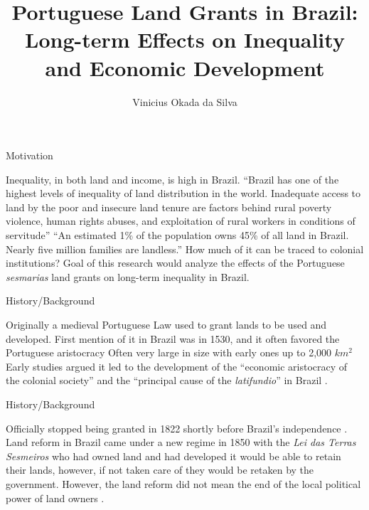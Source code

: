 \documentclass[aspectratio=1610]{beamer}
\title{Portuguese Land Grants in Brazil: Long-term Effects on Inequality and Economic Development}
\author{Vinicius Okada da Silva}
\institute{The University of Illinois at Urbana-Champaign}
\date{}
\begin{document}
\begin{frame}
	\titlepage
\end{frame}

\begin{frame}{Motivation}
    \begin{outline}
        \1 Inequality, in both land and income, is high in Brazil.
            \2 ``Brazil has one of the highest levels of inequality of land distribution in the world. Inadequate access to land by the poor and insecure land tenure are factors behind rural poverty violence, human rights abuses, and exploitation of rural workers in conditions of servitude'' \parencite{Usaid2016-xs}
            \2 ``An estimated 1\% of the population owns 45\% of all land in Brazil. Nearly five million families are landless.'' \parencite{Usaid2016-xs}
        \1 How much of it can be traced to colonial institutions?
            \2 Goal of this research would analyze the effects of the Portuguese \textit{sesmarias} land grants on long-term inequality in Brazil.
    \end{outline}
\end{frame}

\begin{frame}{History/Background}
    \begin{outline}
        \1 Originally a medieval Portuguese Law used to grant lands to be used and developed.
        \1 First mention of it in Brazil was in 1530, and it often favored the Portuguese aristocracy \parencite{Lobb1976-mc}
            \2 Often very large in size with early ones up to 2,000 $km^2$ \parencite{Nozoe2006-hj}
            \2 Early studies argued it led to the development of the ``economic aristocracy of the colonial society'' and the ``principal cause of the \textit{latifundio}'' in Brazil \parencites[p.~36]{Lima2002-kd}[p.~48]{Da_Costa_Porto1979-dz}.
    \end{outline}
\end{frame}

\begin{frame}{History/Background}
    \begin{outline}
        \1 Officially stopped being granted in 1822 shortly before Brazil's independence \parencite{Silva2019-vj}. 
        \1 Land reform in Brazil came under a new regime in 1850 with the \textit{Lei das Terras} \parencite[p.~148]{Da_Costa_Porto1979-dz}
            \2 \textit{Sesmeiros} who had owned land and had developed it would be able to retain their lands, however, if not taken care of they would be retaken by the government.
            \2 However, the land reform did not mean the end of the local political power of land owners \parencite{Motta1998-xw}.
    \end{outline}    
\end{frame}
\end{document}
